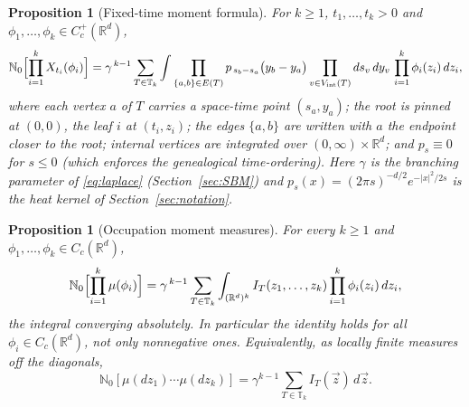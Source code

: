 \documentclass[11pt]{article}
\newtheorem{proposition}[theorem]{Proposition}
\theoremstyle{definition}
\theoremstyle{remark}
\newcommand{\R}{\mathbb{R}}
\newcommand{\bN}{{\mathbb{N}_0}}                 %
\newcommand{\Cc}{C_c^+(\R^d)}
\newcommand{\Ccg}{C_c(\R^d)}                   %
\newcommand{\T}{\mathbb{T}}                    %
\numberwithin{equation}{section}
\theoremstyle{plain}
\theoremstyle{definition}
\theoremstyle{remark}
\theoremstyle{plain}
\begin{document}
\begin{proposition}[Fixed-time moment formula]
For $k\ge1$, $t_1,\dots,t_k>0$ and $\phi_1,\dots,\phi_k\in\Cc$,
\begin{equation}\label{eq:timemoments}
\bN\Bigl[\prod_{i=1}^k X_{t_i}(\phi_i)\Bigr]
=\gamma^{\,k-1}\sum_{T\in\T_k}
\int
\prod_{\{a,b\}\in E(T)} p_{\,s_b-s_a}\bigl(y_b-y_a\bigr)
\prod_{v\in V_{\mathrm{int}}(T)} ds_v\,dy_v\,
\prod_{i=1}^k\phi_i(z_i)\,dz_i ,
\end{equation}
where each vertex $a$ of $T$ carries a space-time point $(s_a,y_a)$; the
root is pinned at $(0,0)$, the leaf $i$ at $(t_i,z_i)$; the edges
$\{a,b\}$ are written with $a$ the endpoint closer to the root; internal
vertices are integrated over $(0,\infty)\times\R^d$; and $p_s\equiv0$ for
$s\le0$ (which enforces the genealogical time-ordering). Here $\gamma$ is the branching parameter of \eqref{eq:laplace} (Section~\ref{sec:SBM}) and $p_s(x)=(2\pi s)^{-d/2}e^{-|x|^2/2s}$ is the heat kernel of Section~\ref{sec:notation}.
\end{proposition}

\begin{proposition}[Occupation moment measures]\label{prop:occmoments}
For every $k\ge1$ and $\phi_1,\dots,\phi_k\in\Ccg$,
\begin{equation}\label{eq:occmoments}
\bN\Bigl[\prod_{i=1}^k\mu(\phi_i)\Bigr]
=\gamma^{\,k-1}\sum_{T\in\T_k}\int_{(\R^d)^k}
I_T(z_1,\dots,z_k)\prod_{i=1}^k\phi_i(z_i)\,dz_i ,
\end{equation}
the integral converging absolutely. In particular the identity holds
for all $\phi_i\in\Ccg$, not only nonnegative ones.
Equivalently, as locally finite measures off the diagonals,
\[\bN\left[\mu(dz_1)\cdots\mu(dz_k)\right]
=\gamma^{k-1}\sum_{T\in\T_k}I_T(\vec z)\,d\vec z.\]
\end{proposition}
\end{document}
